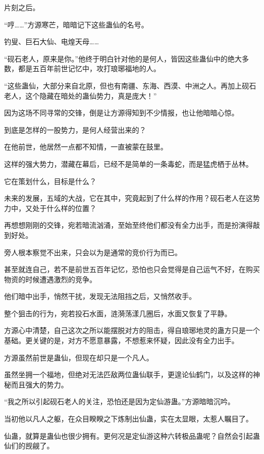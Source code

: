 
\begin{this_body}

片刻之后。

“哼……”方源寒芒，暗暗记下这些蛊仙的名号。

钓叟、巨石大仙、电煌天母……

“砚石老人，原来是你。”他终于明白针对他的是何人，皆因这些蛊仙中的绝大多数，都是五百年前世记忆中，攻打琅琊福地的人。

“这些蛊仙，大部分来自北原，但也有南疆、东海、西漠、中洲之人。再加上砚石老人，这个隐藏在暗处的蛊仙势力，真是庞大！”

因为这场不同寻常的交锋，倒是让方源得知到不少情报，也让他暗暗心惊。

到底是怎样的一股势力，是何人经营出来的？

在他前世，他居然一点都不知情，一直被蒙在鼓里。

这样的强大势力，潜藏在幕后，已经不是简单的一条毒蛇，而是猛虎栖于丛林。

它在策划什么，目标是什么？

未来的发展，五域的大战，它在其中，究竟起到了什么样的作用？砚石老人在这势力中，又处于什么样的位置？

再想想刚刚的交锋，宛若暗流汹涌，至始至终他们都没有全力出手，而是扮演得敲到好处。

旁人根本察觉不出来，只会以为是通常的竞价行为而已。

甚至就连自己，若不是前世五百年记忆，恐怕也只会觉得是自己运气不好，在购买物资的时候遭遇激烈的竞争。

他们暗中出手，悄然干扰，发现无法阻挡之后，又悄然收手。

整个狙击的行为，宛若投石水面，涟漪荡漾几圈后，水面又恢复了平静。

方源心中清楚，自己这次之所以能摆脱对方的阻击，得自琅琊地灵的蛊方只是一个基础。更关键的是，对方不愿意暴露，不想惹来怀疑，因此没有全力出手。

方源虽然前世是蛊仙，但现在却只是一个凡人。

虽然坐拥一个福地，但绝对无法匹敌两位蛊仙联手，更遑论仙鹤门，以及这样的神秘而且强大的势力。

“我之所以引起砚石老人的关注，恐怕还是因为定仙游蛊。”方源暗暗沉吟。

当初他以凡人之躯，在众目睽睽之下炼制出仙蛊，实在太显眼，太惹人瞩目了。

仙蛊，就算是蛊仙也很少拥有。更何况是定仙游这种六转极品蛊呢？自然会引起蛊仙们的觊觎了。


\end{this_body}
